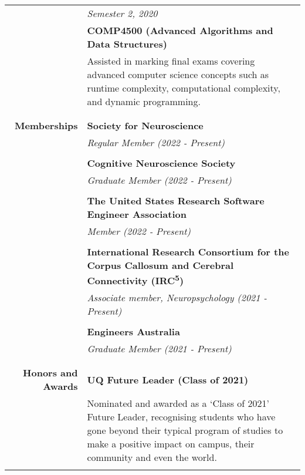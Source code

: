 \documentclass{article}
\begin{document}
\begin{longtable}{r | p{13cm}}
											& \textit{Semester 2, 2020} \\
											& \textbf{COMP4500 (Advanced Algorithms and Data Structures)} \\
											& Assisted in marking final exams covering advanced computer science concepts such as runtime complexity, computational complexity, and dynamic programming. \\
											& \\
											\hline

											\pagebreak

											\hline \\

		\large\textbf{Memberships} 	  		& \large\textbf{Society for Neuroscience} \\
											& \textit{Regular Member (2022 - Present)} \\
											& \\
											
											& \large\textbf{Cognitive Neuroscience Society} \\
											& \textit{Graduate Member (2022 - Present)} \\
											& \\
		
		
											& \large\textbf{The United States Research Software Engineer Association} \\
											& \textit{Member (2022 - Present)} \\
											& \\
		
											& \large\textbf{International Research Consortium for the Corpus Callosum and Cerebral Connectivity (IRC\textsuperscript{5})} \\
											& \textit{Associate member, Neuropsychology (2021 - Present)} \\ 
											& \\

											& \large\textbf{Engineers Australia} \\
											& \textit{Graduate Member (2021 - Present)} \\
											& \\
											\hline \\

		\large\textbf{Honors and Awards}	& \large\textbf{UQ Future Leader (Class of 2021)} \\
											& Nominated and awarded as a `Class of 2021' Future Leader, recognising students who have gone beyond their typical program of studies to make a positive impact on campus, their community and even the world.  \\
											& \\


\end{longtable}
\end{document}
